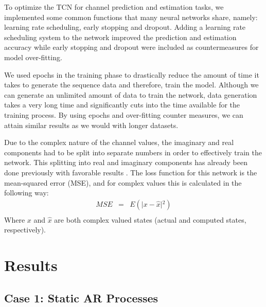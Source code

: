 \documentclass[twocolumn,letterpaper]{IEEEAerospaceCLS}  %
\begin{document}
To optimize the TCN for channel prediction and estimation tasks, we implemented some common functions that many neural networks share, namely: learning rate scheduling, early stopping and dropout. Adding a learning rate scheduling system to the network improved the prediction and estimation accuracy while early stopping and dropout were included as countermeasures for model over-fitting. 

We used epochs in the training phase to drastically reduce the amount of time it takes to generate the sequence data and therefore, train the model. Although we can generate an unlimited amount of data to train the network, data generation takes a very long time and significantly cuts into the time available for the training process. By using epochs and over-fitting counter measures, we can attain similar results as we would with longer datasets. 

Due to the complex nature of the channel values, the imaginary and real components had to be split into separate numbers in order to effectively train the network. This splitting into real and imaginary components has already been done previously with favorable results \cite{tacspinar2010back}.  The loss function for this network is the mean-squared error (MSE), and for complex values this is calculated in the following way:
\begin{eqnarray*}
MSE&=&E(\lvert {x-\hat{x}}\rvert{^2}) \\
\end{eqnarray*}
Where $x$ and $\hat{x}$ are both complex valued states (actual and computed states, respectively). 


\section{Results}
\label{sec:results}

\subsection{Case 1: Static AR Processes}
\end{document}
